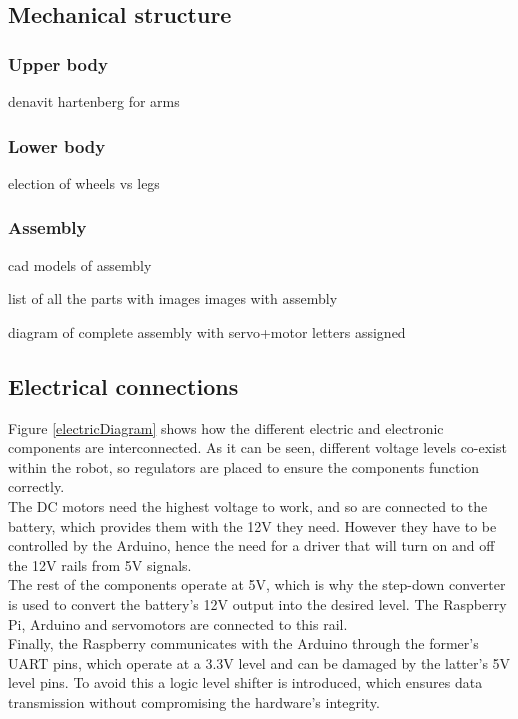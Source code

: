 \subsection{Mechanical structure}
\subsubsection{Upper body}
denavit hartenberg for arms

\subsubsection{Lower body}
election of wheels vs legs

\subsubsection{Assembly}
cad models of assembly

list of all the parts with images
images with assembly 

diagram of complete assembly with servo+motor letters assigned

\subsection{Electrical connections}

Figure \ref{electricDiagram} shows how the different electric and electronic components are interconnected.  As it can be seen, different voltage levels co-exist within the robot, so regulators are placed to ensure the components function correctly. \\

The DC motors need the highest voltage to work, and so are connected to the battery, which provides them with the 12V they need. However they have to be controlled by the Arduino, hence the need for a driver that will turn on and off the 12V rails from 5V signals.\\

The rest of the components operate at 5V, which is why the step-down converter is used to convert the battery's 12V output into the desired level. The Raspberry Pi, Arduino and servomotors are connected to this rail.\\

Finally, the Raspberry communicates with the Arduino through the former's UART pins, which operate at a 3.3V level and can be damaged by the latter's 5V level pins. To avoid this a logic level shifter is introduced, which ensures data transmission without compromising the hardware's integrity.\\

